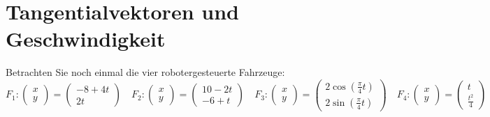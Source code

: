 \section{Tangentialvektoren und Geschwindigkeit}
Betrachten Sie noch einmal die vier robotergesteuerte Fahrzeuge:
\[
    F_1 : \begin{pmatrix}
        x \\y
    \end{pmatrix}
    =
    \begin{pmatrix}
        -8 + 4t \\
        2t
    \end{pmatrix}
    \quad
    F_2 : \begin{pmatrix}
        x \\y
    \end{pmatrix}
    = \begin{pmatrix}
        10 - 2t \\
        -6 + t
    \end{pmatrix}
    \quad
    F_3 : \begin{pmatrix}
        x \\y
    \end{pmatrix}
    =
    \begin{pmatrix}
        2 \cos\left(\frac{\pi}{4}t\right) \\
        2 \sin\left(\frac{\pi}{4}t\right)
    \end{pmatrix}
    \quad
    F_4 : \begin{pmatrix}
        x \\y
    \end{pmatrix}
    = \begin{pmatrix}
        t \\
        \frac{t^2}{4}
    \end{pmatrix}
\]
